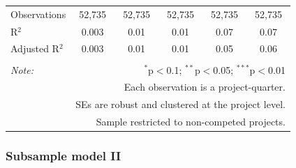 \documentclass[
]{article}
\begin{document}
\begin{table}[H]
\begin{tabular}{@{\extracolsep{-2pt}}lccccc}
Observations & 52,735 & 52,735 & 52,735 & 52,735 & 52,735 \\ 
R$^{2}$ & 0.003 & 0.01 & 0.01 & 0.07 & 0.07 \\ 
Adjusted R$^{2}$ & 0.003 & 0.01 & 0.01 & 0.05 & 0.06 \\ 
\hline 
\hline \\[-1.8ex] 
\textit{Note:}  & \multicolumn{5}{r}{$^{*}$p$<$0.1; $^{**}$p$<$0.05; $^{***}$p$<$0.01} \\ 
 & \multicolumn{5}{r}{Each observation is a project-quarter.} \\ 
 & \multicolumn{5}{r}{SEs are robust and clustered at the project level.} \\ 
 & \multicolumn{5}{r}{Sample restricted to non-competed projects.} \\ 
\end{tabular} 
\end{table}

\hypertarget{subsample-model-ii}{%
\subsubsection{Subsample model II}\label{subsample-model-ii}}
\end{document}
